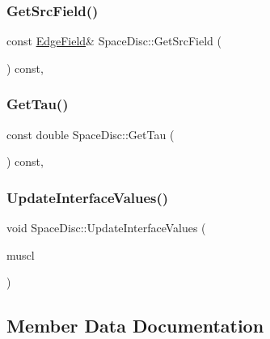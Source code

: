 \subsubsection{\texorpdfstring{Get\+Src\+Field()}{GetSrcField()}}
{\footnotesize\ttfamily const \hyperlink{ValueField_8h_afe95c3cf57931e46528822035916f101}{Edge\+Field}\& Space\+Disc\+::\+Get\+Src\+Field (\begin{DoxyParamCaption}{ }\end{DoxyParamCaption}) const\hspace{0.3cm}{\ttfamily [inline]}, {\ttfamily [noexcept]}}

\mbox{\label{structSpaceDisc_ab5d1e593defca1bd66222feb14d50c14}} 
\subsubsection{\texorpdfstring{Get\+Tau()}{GetTau()}}
{\footnotesize\ttfamily const double Space\+Disc\+::\+Get\+Tau (\begin{DoxyParamCaption}{ }\end{DoxyParamCaption}) const\hspace{0.3cm}{\ttfamily [inline]}, {\ttfamily [noexcept]}}

\mbox{\label{structSpaceDisc_aeb63d95bb23cf1c008b7a66e65be4e7f}} 
\subsubsection{\texorpdfstring{Update\+Interface\+Values()}{UpdateInterfaceValues()}}
{\footnotesize\ttfamily void Space\+Disc\+::\+Update\+Interface\+Values (\begin{DoxyParamCaption}\item[{const \hyperlink{structMUSCLObject_1_1MUSCL}{M\+U\+S\+CL} \&}]{muscl }\end{DoxyParamCaption})\hspace{0.3cm}{\ttfamily [protected]}}



\subsection{Member Data Documentation}
\mbox{\label{structSpaceDisc_a64789d9c4477009dc62c6c5b062d97c9}} 
